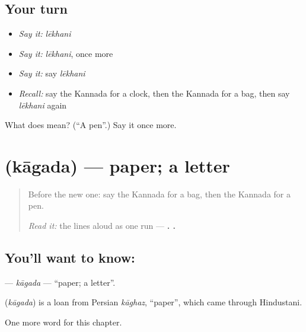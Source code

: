 \subsection*{Your turn}
\begin{itemize}
\raggedright
  \item \emph{Say it:} \emph{lēkhani}
  \item \emph{Say it:} \emph{lēkhani}, once more
  \item \emph{Say it:} say \emph{lēkhani}
  \item \emph{Recall:} say the Kannada for a clock, then the Kannada for a bag, then say \emph{lēkhani} again
\end{itemize}

\begin{tcolorbox}[breakable,colback=teal!4,colframe=teal!35!black,title={Before you move on}]
What does  mean? (\textquotedblleft{}A pen\textquotedblright{}.) Say it once more.
\end{tcolorbox}
\section[\texorpdfstring{\kn{ಕಾಗದ} (kāgada)}{ಕಾಗದ (kāgada)}]{ (kāgada) — paper; a letter}

\label{lesson:KA-C118-kagada}



\begin{quote}
Before the new one: say the Kannada for a bag, then the Kannada for a pen.

\emph{Read it:} the lines aloud as one run — \textbf{ .   .}
\end{quote}

\subsection*{You'll want to know: }
\textbf{} — \emph{kāgada} — \textquotedblleft{}paper; a letter\textquotedblright{}.

\begin{cousinweb}
\textbf{} (\emph{kāgada}) is a loan from Persian \emph{kāghaz}, \textquotedblleft{}paper\textquotedblright{}, which came through Hindustani.
\end{cousinweb}

\begin{grammarlens}[title={What you've built}]
One more word for this chapter.
\end{grammarlens}

